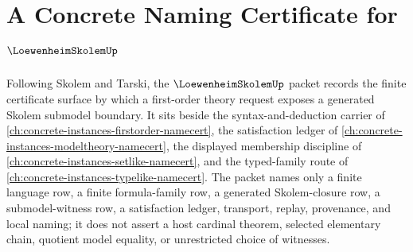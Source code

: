 \chapter{A Concrete Naming Certificate for $\LoewenheimSkolemUp$}
\label{ch:concrete-instances-loewenheim-skolem-namecert}

Following Skolem and Tarski, the $\LoewenheimSkolemUp$ packet records the finite certificate surface by which a first-order theory request exposes a generated Skolem submodel boundary. It sits beside the syntax-and-deduction carrier of \autoref{ch:concrete-instances-firstorder-namecert}, the satisfaction ledger of \autoref{ch:concrete-instances-modeltheory-namecert}, the displayed membership discipline of \autoref{ch:concrete-instances-setlike-namecert}, and the typed-family route of \autoref{ch:concrete-instances-typelike-namecert}. The packet names only a finite language row, a finite formula-family row, a generated Skolem-closure row, a submodel-witness row, a satisfaction ledger, transport, replay, provenance, and local naming; it does not assert a host cardinal theorem, selected elementary chain, quotient model equality, or unrestricted choice of witnesses.

